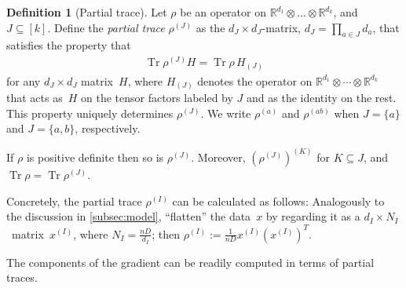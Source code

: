 \documentclass[aos]{imsart}
\theoremstyle{definition}
\newtheorem*{definition}{Definition}
\numberwithin{equation}{section}
\DeclareMathOperator{\tr}{Tr}
\DeclarePairedDelimiter{\norm}{\lVert}{\rVert}
\newcommand{\R}{{\mathbb{R}}}
\newcommand{\ot}{\otimes}
\newcommand{\MW}[1]{{\color{red}[MW: #1]}}
\begin{document}
\begin{definition}[Partial trace]
Let $\rho$ be an operator on $\R^{d_1} \ot \dots \ot \R^{d_k}$, and~$J \subseteq [k]$.
Define the \emph{partial trace} $\rho^{(J)}$ as the $d_J \times d_J$-matrix, $d_J = \prod_{a\in J} d_a$, that satisfies the property that
\begin{align}\label{eq:partial trace duality}
  \tr \rho^{(J)} H
= \tr \rho \, H_{(J)}
\end{align}
for any $d_J\times d_J$ matrix~$H$, where $H_{(J)}$ denotes the operator on $\R^{d_1} \ot \cdots \ot \R^{d_k}$ that acts as~$H$ on the tensor factors labeled by $J$ and as the identity on the rest.
This property uniquely determines $\rho^{(J)}$.
We write $\rho^{(a)}$ and $\rho^{(ab)}$ when $J=\{a\}$ and $J=\{a,b\}$, respectively.


If $\rho$ is positive definite then so is $\rho^{(J)}$.
Moreover, $(\rho^{(J)})^{(K)}$ for $K \subseteq J$, and $\tr \rho = \tr \rho^{(J)}$.
\end{definition}

Concretely, the partial trace $\rho^{(I)}$ can be calculated as follows:
Analogously to the discussion in \cref{subsec:model}, ``flatten'' the data~$x$ by regarding it as a $d_I \times N_I$~matrix~$x^{(I)}$, where $N_I = \frac{nD}{d_I}$;
then $\rho^{(I)} := \frac1{nD} x^{(I)} (x^{(I)})^T$.

The components of the gradient can be readily computed in terms of partial traces.

\end{document}
